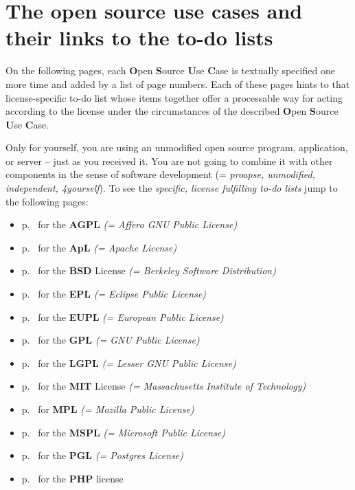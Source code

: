 \section{The open source use cases and their links to the to-do lists}

On the following pages, each \textbf{O}pen \textbf{S}ource \textbf{U}se
\textbf{C}ase is textually specified one more time and added by a list of page
numbers. Each of these pages hints to that license-specific to-do list whose
items together offer a processable way for acting according to the license under
the circumstances of the described \textbf{O}pen \textbf{S}ource \textbf{U}se
\textbf{C}ase.

\begin{description}
\label{OSUCList}
\item[OSUC-01:]\label{OSUC-01-DEF}
Only for yourself, you are using an unmodified open source program, application,
or server -- just as you received it. You are not going to combine it with other
components in the sense of software development (= \textit{proapse, unmodified,
independent, 4yourself}). 
To see the \textit{specific, license fulfilling to-do lists} jump to the
following pages:
  \begin{itemize}
    \item p.\ \pageref{OSUC-01-AGPL} for the \textbf{AGPL}
      \textit{(= Affero GNU Public License)} 
    \item p.\ \pageref{OSUC-01-Apache20} for the \textbf{ApL}
      \textit{(= Apache License)}
    \item p.\ \pageref{OSUC-01-BSD} for the \textbf{BSD} License
      \textit{(= Berkeley Software Distribution)}
    \item p.\ \pageref{OSUC-01-EPL} for the \textbf{EPL}
      \textit{(= Eclipse Public License)}     
    \item p.\ \pageref{OSUC-01-EUPL} for the \textbf{EUPL}
      \textit{(= European Public License)} 
    \item p.\ \pageref{OSUC-01-GPL} for the \textbf{GPL}
       \textit{(= GNU Public License)} 
    \item p.\ \pageref{OSUC-01-LGPL} for the \textbf{LGPL}
      \textit{(= Lesser GNU Public License)}           
    \item p.\ \pageref{OSUC-01-MIT} for the \textbf{MIT} License
       \textit{(= Massachusetts Institute of Technology)} 
    \item p.\ \pageref{OSUC-01-MPL} for \textbf{MPL}
      \textit{(= Mozilla Public License)}     
    \item p.\ \pageref{OSUC-01-MsPL} for the \textbf{MSPL}
      \textit{(= Microsoft Public License)} 
    \item p.\ \pageref{OSUC-01-PGL} for the \textbf{PGL}
      \textit{(= Postgres License)} 
    \item p.\ \pageref{OSUC-01-PHP} for the \textbf{PHP} license 
  \end{itemize}


\end{description}
